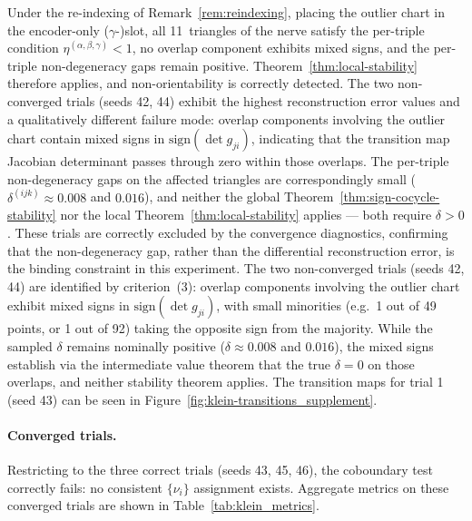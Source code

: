 \documentclass[11pt]{article}
\theoremstyle{plain}
\theoremstyle{definition}
\theoremstyle{remark}
\begin{document}
Under the re-indexing of 
Remark~\ref{rem:reindexing}, placing the outlier chart in 
the encoder-only ($\gamma$-)slot, all 11~triangles of the 
nerve satisfy the per-triple condition 
$\eta^{(\alpha,\beta,\gamma)} < 1$, no overlap component 
exhibits mixed signs, and the per-triple non-degeneracy gaps 
remain positive.  
Theorem~\ref{thm:local-stability} therefore applies, and 
non-orientability is correctly detected.  The two 
non-converged trials (seeds 42, 44) exhibit the highest reconstruction error values and a qualitatively 
different failure mode: overlap components involving the 
outlier chart contain mixed signs in 
$\mathrm{sign}(\det g_{ji})$, indicating that the 
transition map Jacobian determinant passes through zero 
within those overlaps.  The per-triple non-degeneracy gaps 
on the affected triangles are correspondingly small 
($\delta^{(ijk)} \approx 0.008$ and $0.016$), and neither 
the global Theorem~\ref{thm:sign-cocycle-stability} nor the 
local Theorem~\ref{thm:local-stability} applies --- both 
require $\delta > 0$.  These trials are correctly excluded 
by the convergence diagnostics, confirming that the 
non-degeneracy gap, rather than the differential 
reconstruction error, is the binding constraint in this 
experiment. The two non-converged trials (seeds 42, 44) are identified 
by criterion~(3): overlap components involving the outlier 
chart exhibit mixed signs in $\mathrm{sign}(\det g_{ji})$, 
with small minorities (e.g.\ 1 out of 49 points, or 1 out 
of 92) taking the opposite sign from the majority.  While 
the sampled $\delta$ remains nominally positive 
($\delta \approx 0.008$ and $0.016$), the mixed signs 
establish via the intermediate value theorem that the true 
$\delta = 0$ on those overlaps, and neither stability 
theorem applies. The transition maps for trial 1 (seed 43) can be seen in Figure~\ref{fig:klein-transitions_supplement}.


\paragraph{Converged trials.}
Restricting to the three correct trials (seeds 43, 45, 46), the coboundary test correctly fails: no consistent $\{\nu_i\}$ assignment exists. Aggregate metrics on these converged trials are shown in Table~\ref{tab:klein_metrics}.
\end{document}
